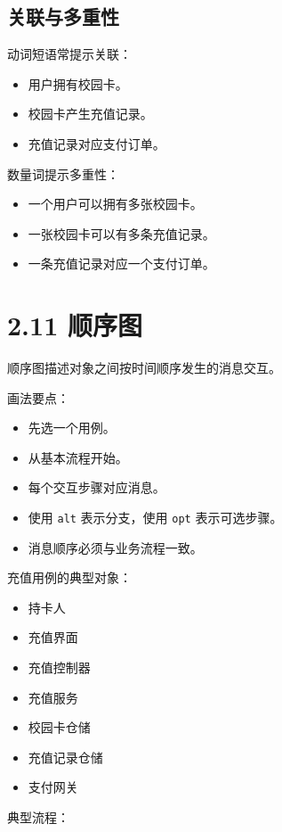\documentclass[UTF8,zihao=-4]{ctexart}
\begin{document}
\subsection{关联与多重性}

动词短语常提示关联：

\begin{itemize}
\item 用户拥有校园卡。
\item 校园卡产生充值记录。
\item 充值记录对应支付订单。
\end{itemize}

数量词提示多重性：

\begin{itemize}
\item 一个用户可以拥有多张校园卡。
\item 一张校园卡可以有多条充值记录。
\item 一条充值记录对应一个支付订单。
\end{itemize}

\section{2.11 顺序图}

顺序图描述对象之间按时间顺序发生的消息交互。

画法要点：

\begin{itemize}
\item 先选一个用例。
\item 从基本流程开始。
\item 每个交互步骤对应消息。
\item 使用 \texttt{alt} 表示分支，使用 \texttt{opt} 表示可选步骤。
\item 消息顺序必须与业务流程一致。
\end{itemize}

充值用例的典型对象：

\begin{itemize}
\item 持卡人
\item 充值界面
\item 充值控制器
\item 充值服务
\item 校园卡仓储
\item 充值记录仓储
\item 支付网关
\end{itemize}

典型流程：
\end{document}
